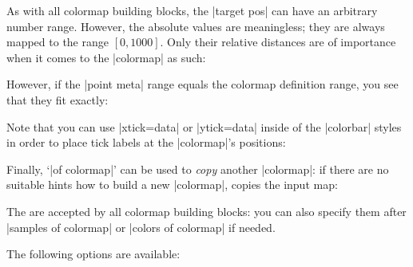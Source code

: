{\begin{enumerate}
        As with all colormap building blocks, the |target pos| can have an
        arbitrary number range. However, the absolute values are meaningless;
        they are always mapped to the range $[0,1000]$. Only their relative
        distances are of importance when it comes to the |colormap| as such:
\begin{codeexample}[]
\pgfplotscolorbardrawstandalone[
    colormap={example}{
        of colormap={viridis,
            target pos={-10,-3,0,1,2},
            sample for=const,
        },
    },
    colorbar horizontal,
    colormap access=const]
\end{codeexample}
        However, if the |point meta| range equals the colormap definition
        range, you see that they fit exactly:
\begin{codeexample}[]
\pgfplotscolorbardrawstandalone[
    colormap={example}{
        of colormap={viridis,
            target pos={-10,-3,0,1,2},
            sample for=const,
        },
    },
    point meta min=-10,point meta max=2,
    colorbar horizontal,
    colormap access=const]
\end{codeexample}
        Note that you can use |xtick=data| or |ytick=data| inside of the
        |colorbar| styles in order to place tick labels at the |colormap|'s
        positions:
\begin{codeexample}[]
\pgfplotscolorbardrawstandalone[
    colormap={example}{
        of colormap={viridis,
            target pos={-10,-3,0,1,2},
            sample for=const,
        },
    },
    point meta min=-10,point meta max=2,
    colorbar horizontal,
    colorbar style={xtick=data},
    colormap access=const]
\end{codeexample}

        Finally, `|of colormap|' can be used to \emph{copy} another |colormap|:
        if there are no suitable hints how to build a new |colormap|,
        \PGFPlots{} copies the input map:
\begin{codeexample}[]
\pgfplotscolorbardrawstandalone[
    colormap={example}{
        of colormap={viridis},
    },
    colorbar horizontal,
    colormap access=const]
\end{codeexample}

        The  are accepted by all colormap building blocks: you
        can also specify them after |samples of colormap| or
        |colors of colormap| if needed.

        The following options are available:


\end{enumerate}}
